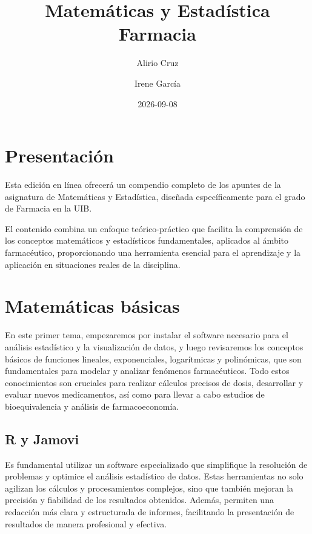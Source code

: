 \documentclass[
  spanish,
  letterpaper,
  DIV=11,
  numbers=noendperiod]{scrreprt}
\title{Matemáticas y Estadística Farmacia}
\author{Alirio Cruz \and Irene García}
\date{2026-09-08}
\renewcommand*\contentsname{Tabla de contenidos}
\newcommand\contentsname{Tabla de contenidos}
\begin{document}
\maketitle

\renewcommand*\contentsname{Tabla de contenidos}
{
\setcounter{tocdepth}{2}
\tableofcontents
}


\chapter*{Presentación}\label{presentaciuxf3n}


Esta edición en línea ofrecerá un compendio completo de los apuntes de
la asignatura de Matemáticas y Estadística, diseñada específicamente
para el grado de Farmacia en la UIB.

El contenido combina un enfoque teórico-práctico que facilita la
comprensión de los conceptos matemáticos y estadísticos fundamentales,
aplicados al ámbito farmacéutico, proporcionando una herramienta
esencial para el aprendizaje y la aplicación en situaciones reales de la
disciplina.


\chapter{Matemáticas básicas}\label{matemuxe1ticas-buxe1sicas}

En este primer tema, empezaremos por instalar el software necesario para
el análisis estadístico y la visualización de datos, y luego revisaremos
los conceptos básicos de funciones lineales, exponenciales, logarítmicas
y polinómicas, que son fundamentales para modelar y analizar fenómenos
farmacéuticos. Todo estos conocimientos son cruciales para realizar
cálculos precisos de dosis, desarrollar y evaluar nuevos medicamentos,
así como para llevar a cabo estudios de bioequivalencia y análisis de
farmacoeconomía.

\section{R y Jamovi}\label{r-y-jamovi}

Es fundamental utilizar un software especializado que simplifique la
resolución de problemas y optimice el análisis estadístico de datos.
Estas herramientas no solo agilizan los cálculos y procesamientos
complejos, sino que también mejoran la precisión y fiabilidad de los
resultados obtenidos. Además, permiten una redacción más clara y
estructurada de informes, facilitando la presentación de resultados de
manera profesional y efectiva.
\end{document}
